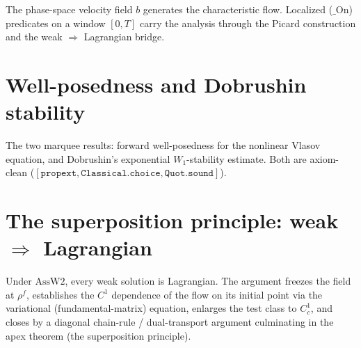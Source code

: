The phase-space velocity field $b$ generates the characteristic flow.  Localized ($\_\mathrm{On}$)
predicates on a window $[0,T]$ carry the analysis through the Picard construction and the
weak $\Rightarrow$ Lagrangian bridge.


\chapter{Well-posedness and Dobrushin stability}

The two marquee results: forward well-posedness for the nonlinear Vlasov equation, and
Dobrushin's exponential $W_1$-stability estimate.  Both are axiom-clean
($[\mathtt{propext}, \mathtt{Classical.choice}, \mathtt{Quot.sound}]$).


\chapter[The superposition principle: weak implies Lagrangian]{The superposition principle: weak $\Rightarrow$ Lagrangian}

Under $\mathrm{AssW2}$, every weak solution is Lagrangian.  The argument freezes the field at
$\rho^f$, establishes the $C^1$ dependence of the flow on its initial point via the variational
(fundamental-matrix) equation, enlarges the test class to $C^1_c$, and closes by a diagonal
chain-rule / dual-transport argument culminating in the apex
theorem (the superposition principle).

